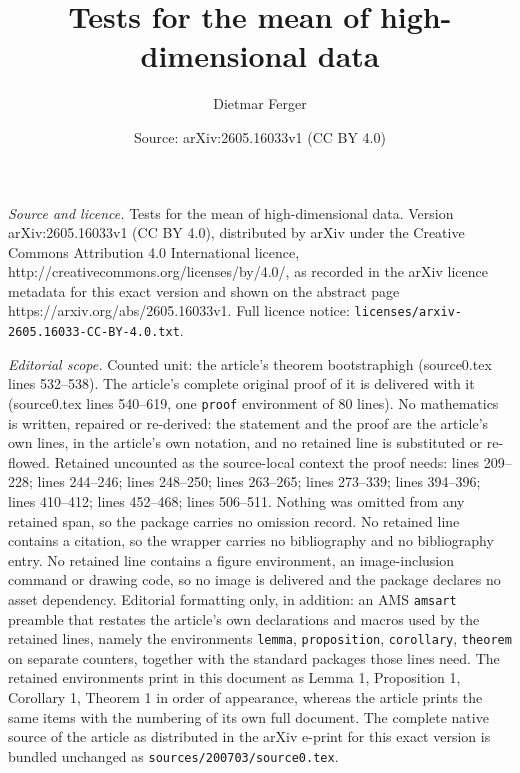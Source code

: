 \documentclass[10pt,a4paper]{amsart}
\title{Tests for the mean of high-dimensional data}
\author{Dietmar Ferger}
\date{Source: arXiv:2605.16033v1 (CC BY 4.0)}
\begin{document}
\maketitle

\noindent\emph{Source and licence.} Tests for the mean of high-dimensional data. Version arXiv:2605.16033v1 (CC BY 4.0), distributed by arXiv under the Creative Commons Attribution 4.0 International licence, http://creativecommons.org/licenses/by/4.0/, as recorded in the arXiv licence metadata for this exact version and shown on the abstract page https://arxiv.org/abs/2605.16033v1. Full licence notice: \texttt{licenses/arxiv-2605.16033-CC-BY-4.0.txt}.\par\smallskip

\noindent\textit{Editorial scope.} Counted unit: the article's theorem bootstraphigh (source0.tex lines 532--538). The article's complete original proof of it is delivered with it (source0.tex lines 540--619, one \texttt{proof} environment of 80 lines). No mathematics is written, repaired or re-derived: the statement and the proof are the article's own lines, in the article's own notation, and no retained line is substituted or re-flowed.  Retained uncounted as the source-local context the proof needs: lines 209--228; lines 244--246; lines 248--250; lines 263--265; lines 273--339; lines 394--396; lines 410--412; lines 452--468; lines 506--511.  Nothing was omitted from any retained span, so the package carries no omission record.  No retained line contains a citation, so the wrapper carries no bibliography and no bibliography entry.  No retained line contains a figure environment, an image-inclusion command or drawing code, so no image is delivered and the package declares no asset dependency.  Editorial formatting only, in addition: an AMS \texttt{amsart} preamble that restates the article's own declarations and macros used by the retained lines, namely the environments \texttt{lemma}, \texttt{proposition}, \texttt{corollary}, \texttt{theorem} on separate counters, together with the standard packages those lines need.  The retained environments print in this document as Lemma 1, Proposition 1, Corollary 1, Theorem 1 in order of appearance, whereas the article prints the same items with the numbering of its own full document.  The complete native source of the article as distributed in the arXiv e-print for this exact version is bundled unchanged as \texttt{sources/200703/source0.tex}.
\end{document}
